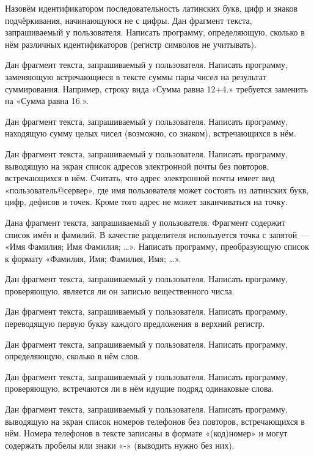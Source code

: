 \task Назовём идентификатором последовательность латинских букв, цифр
и знаков подчёркивания, начинающуюся не с цифры. Дан фрагмент текста,
запрашиваемый у пользователя. Написать программу, определяющую,
сколько в нём различных идентификаторов (регистр символов не
учитывать).

\task Дан фрагмент текста, запрашиваемый у пользователя. Написать
программу, заменяющую встречающиеся в тексте суммы пары чисел на
результат суммирования. Например, строку вида «Сумма равна 12+4.»
требуется заменить на «Сумма равна 16.».

\task Дан фрагмент текста, запрашиваемый у пользователя. Написать
программу, находящую сумму целых чисел (возможно, со знаком),
встречающихся в нём.

\task Дан фрагмент текста, запрашиваемый у пользователя. Написать
программу, выводящую на экран список адресов электронной почты без
повторов, встречающихся в нём. Считать, что адрес электронной почты
имеет вид «пользователь@сервер», где имя пользователя может состоять
из латинских букв, цифр, дефисов и точек. Кроме того адрес не может
заканчиваться на точку.

\task Дана фрагмент текста, запрашиваемый у пользователя. Фрагмент
содержит список имён и фамилий. В качестве разделителя используется
точка с запятой — «Имя Фамилия; Имя Фамилия; …». Написать программу,
преобразующую список к формату «Фамилия, Имя; Фамилия, Имя; …».

\task Дан фрагмент текста, запрашиваемый у пользователя. Написать
программу, проверяющую, является ли он записью вещественного числа.

\task Дан фрагмент текста, запрашиваемый у пользователя. Написать
программу, переводящую первую букву каждого предложения в верхний
регистр.

\task Дан фрагмент текста, запрашиваемый у пользователя. Написать
программу, определяющую, сколько в нём слов.

\task Дан фрагмент текста, запрашиваемый у пользователя. Написать
программу, проверяющую, встречаются ли в нём идущие подряд одинаковые
слова.

\task Дан фрагмент текста, запрашиваемый у пользователя. Написать
программу, выводящую на экран список номеров телефонов без повторов,
встречающихся в нём. Номера телефонов в тексте записаны в формате
«(код)номер» и могут содержать пробелы или знаки «-» (выводить нужно
без них).
